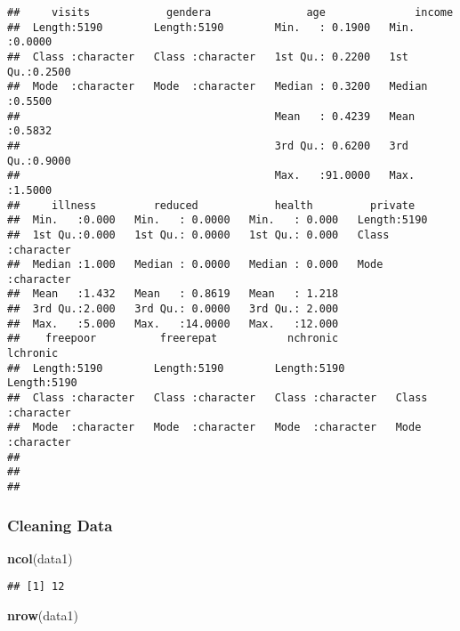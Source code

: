 \documentclass[
]{article}
\newenvironment{Shaded}{\begin{snugshade}}{\end{snugshade}}
\newcommand{\FunctionTok}[1]{\textcolor[rgb]{0.13,0.29,0.53}{\textbf{#1}}}
\newcommand{\NormalTok}[1]{#1}
\begin{document}
\begin{verbatim}
##     visits            gendera               age              income      
##  Length:5190        Length:5190        Min.   : 0.1900   Min.   :0.0000  
##  Class :character   Class :character   1st Qu.: 0.2200   1st Qu.:0.2500  
##  Mode  :character   Mode  :character   Median : 0.3200   Median :0.5500  
##                                        Mean   : 0.4239   Mean   :0.5832  
##                                        3rd Qu.: 0.6200   3rd Qu.:0.9000  
##                                        Max.   :91.0000   Max.   :1.5000  
##     illness         reduced            health         private         
##  Min.   :0.000   Min.   : 0.0000   Min.   : 0.000   Length:5190       
##  1st Qu.:0.000   1st Qu.: 0.0000   1st Qu.: 0.000   Class :character  
##  Median :1.000   Median : 0.0000   Median : 0.000   Mode  :character  
##  Mean   :1.432   Mean   : 0.8619   Mean   : 1.218                     
##  3rd Qu.:2.000   3rd Qu.: 0.0000   3rd Qu.: 2.000                     
##  Max.   :5.000   Max.   :14.0000   Max.   :12.000                     
##    freepoor          freerepat           nchronic           lchronic        
##  Length:5190        Length:5190        Length:5190        Length:5190       
##  Class :character   Class :character   Class :character   Class :character  
##  Mode  :character   Mode  :character   Mode  :character   Mode  :character  
##                                                                             
##                                                                             
## 
\end{verbatim}

\subsubsection{Cleaning Data}\label{cleaning-data}

\begin{Shaded}
\begin{Highlighting}[]
\FunctionTok{ncol}\NormalTok{(data1)}
\end{Highlighting}
\end{Shaded}

\begin{verbatim}
## [1] 12
\end{verbatim}

\begin{Shaded}
\begin{Highlighting}[]
\FunctionTok{nrow}\NormalTok{(data1)}
\end{Highlighting}
\end{Shaded}
\end{document}
